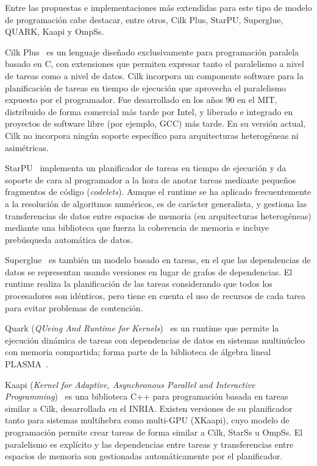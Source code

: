Entre las propuestas e implementaciones más extendidas para este tipo de modelo de programación cabe
destacar, entre otros, Cilk Plus, StarPU, Superglue, QUARK, Kaapi y OmpSs. 

Cilk Plus~\cite{cilkweb,Blumofe:Cilk,Frigo:Cilk,Leiserson:Cilk} es un
lenguaje diseñado exclusivamente para programación paralela basado en C,
con extensiones que permiten expresar tanto el paralelismo a nivel de
tareas como a nivel de datos. Cilk incorpora un componente software para la
planificación de tareas en tiempo de ejecución que aprovecha el paralelismo
expuesto por el programador. Fue desarrollado en los años 90 en el MIT,
distribuido de forma comercial más tarde por Intel, y liberado e integrado
en proyectos de software libre (por ejemplo, GCC) más tarde. En su versión
actual, Cilk no incorpora ningún soporte específico para arquitecturas
heterogéneas ni asimétricas.

StarPU~\cite{starpuweb,Augonnet:2011:SUP:1951453.1951454,agullo:hal-01223573,agullo:hal-01120507}
implementa un planificador de tareas en tiempo de ejecución y da soporte de
cara al programador a la hora de anotar tareas mediante pequeños fragmentos
de código ({\em codelets}). Aunque el runtime se ha aplicado frecuentemente
a la resolución de algoritmos numéricos, es de carácter generalista, y
gestiona las transferencias de datos entre espacios de memoria (en
arquitecturas heterogéneas) mediante una biblioteca que fuerza la coherencia
de memoria e incluye prebúsqueda automática de datos.

Superglue~\cite{superglueweb,tillenius:superglue,tillenius:superglue2} es
también un modelo basado en tareas, en el que las dependencias de datos se
representan usando versiones en lugar de grafos de dependencias. El runtime
realiza la planificación de las tareas considerando que todos los
procesadores son idénticos, pero tiene en cuenta el uso de recursos de cada
tarea para evitar problemas de contención.

Quark ({\em QUeing And Runtime for Kernels})~\cite{quarkweb,icl:609,Haidar}
es un runtime que permite la ejecución dinámica de tareas con dependencias
de datos en sistemas multinúcleo con memoria compartida; forma parte de la
biblioteca de álgebra lineal PLASMA~\cite{Abalenkovs}.

Kaapi ({\em Kernel for Adaptive, Asynchronous Parallel and Interactive Programming})~\cite{kaapiweb,Gautier:2013:XRS:2510661.2511383,Gautier:2007:KTS:1278177.1278182}
es una biblioteca C++ para programación basada en tareas similar a Cilk, desarrollada en el INRIA.
Existen versiones de su planificador tanto para sistemas multihebra como multi-GPU (XKaapi), cuyo
modelo de programación permite crear tareas de forma similar a Cilk, StarSs u OmpSs. El paralelismo
es explícito y las dependencias entre tareas y transferencias entre espacios de memoria son 
gestionadas automáticamente por el planificador.

